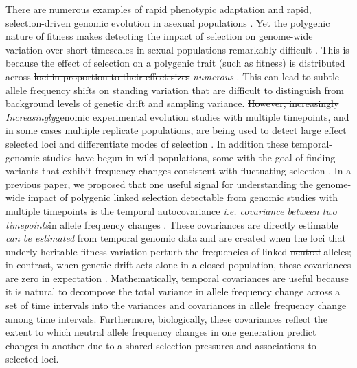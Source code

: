 \documentclass[11pt]{article}
\newcommand{\vb}[1]{{\it \color{blue} #1}}
\providecommand{\DIFaddtex}[1]{{\protect\color{blue}\uwave{#1}}} %
\providecommand{\DIFdeltex}[1]{{\protect\color{red}\sout{#1}}}                      %
\providecommand{\DIFaddbegin}{} %
\providecommand{\DIFaddend}{} %
\providecommand{\DIFdelbegin}{} %
\providecommand{\DIFdelend}{} %
\providecommand{\DIFadd}[1]{\texorpdfstring{\DIFaddtex{#1}}{#1}} %
\providecommand{\DIFdel}[1]{\texorpdfstring{\DIFdeltex{#1}}{}} %
\begin{document}
There are numerous examples of rapid phenotypic adaptation
\parencite{Grant2011-wk,Grant2006-hj,Reznick1997-mh,Franks2007-dr} and rapid,
selection-driven genomic evolution in asexual populations
\parencite{Good2017-om,Bennett1990-bc,Baym2016-kh}.  Yet the polygenic nature
of fitness makes detecting the impact of selection on genome-wide variation
over short timescales in sexual populations remarkably difficult
\DIFaddbegin \vb{\parencite{Latta1998-me, Pritchard2010-tk,Kemper2014-bx}}\DIFaddend . This is because
the effect of selection on a polygenic trait (such as fitness) is distributed
across \DIFdelbegin \DIFdel{loci in proportion to their effect sizes}\DIFdelend \DIFaddbegin \vb{numerous} \DIFadd{loci}\DIFaddend . This can lead to subtle allele frequency shifts on
standing variation that are difficult to distinguish from background levels of
genetic drift and sampling variance. \DIFdelbegin \DIFdel{However, increasingly }\DIFdelend \DIFaddbegin \vb{Increasingly}\DIFadd{, }\DIFaddend genomic experimental
evolution studies with multiple timepoints, and in some cases multiple
replicate populations, are being used to detect large effect selected loci
\parencite{Turner2011-sx,Turner2012-bm} and differentiate modes of selection
\parencite{Burke2010-tz,Barghi2019-qy,Therkildsen2019-zy}.  In addition these
temporal-genomic studies have begun in wild populations, some with the goal of
finding variants that exhibit frequency changes consistent with fluctuating
selection \parencite{Bergland2014-ij,Machado2018-cs}. In a previous paper, we
proposed that one useful signal for understanding the genome-wide impact of
polygenic linked selection detectable from genomic studies with multiple
timepoints is the temporal autocovariance \DIFaddbegin \DIFadd{(}\vb{i.e. covariance between two
timepoints}\DIFadd{) }\DIFaddend in allele frequency changes \parencite{Buffalo2019-io}.  These
covariances \DIFdelbegin \DIFdel{are directly estimable }\DIFdelend \DIFaddbegin \vb{can be estimated} \DIFaddend from temporal genomic data and are created
when the loci that underly heritable fitness variation perturb the frequencies
of linked \DIFdelbegin \DIFdel{neutral }\DIFdelend alleles; in contrast, when genetic drift acts alone in a closed
population, these covariances are zero in expectation \DIFaddbegin \DIFadd{for neutral alleles}\DIFaddend .
Mathematically, temporal covariances are useful because it is natural to
decompose the total variance in allele frequency change across a set of time
intervals into the variances and covariances in allele frequency change among
time intervals.  Furthermore, biologically, these covariances reflect the
extent to which \DIFdelbegin \DIFdel{neutral }\DIFdelend allele frequency changes in one generation predict changes in
another due to a shared selection pressures and associations to selected loci.
\end{document}
